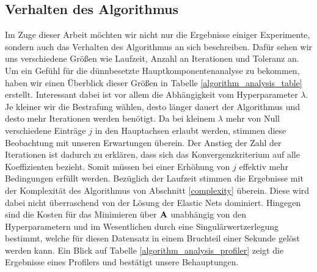 

\subsection{Verhalten des Algorithmus}

Im Zuge dieser Arbeit möchten wir nicht nur die Ergebnisse einiger Experimente, sondern auch das Verhalten des Algorithmus an sich beschreiben. Dafür sehen wir uns verschiedene Größen wie Laufzeit, Anzahl an Iterationen und Toleranz an. Um ein Gefühl für die dünnbesetzte Hauptkomponentenanalyse zu bekommen, haben wir einen Überblick dieser Größen in Tabelle \ref{algorithm_analysis_table} erstellt. Interessant dabei ist vor allem die Abhängigkeit vom Hyperparameter $\lambda$. Je kleiner wir die Bestrafung wählen, desto länger dauert der Algorithmus und desto mehr Iterationen werden benötigt. Da bei kleinem $\lambda$ mehr von Null verschiedene Einträge $j$ in den Hauptachsen erlaubt werden, stimmen diese Beobachtung mit unseren Erwartungen überein. Der Anstieg der Zahl der Iterationen ist dadurch zu erklären, dass sich das Konvergenzkriterium auf alle Koeffizienten bezieht. Somit müssen bei einer Erhöhung von $j$ effektiv mehr Bedingungen erfüllt werden. Bezüglich der Laufzeit stimmen die Ergebnisse mit der Komplexität des Algorithmus von Abschnitt \ref{complexity} überein. Diese wird dabei nicht überraschend von der Lösung der Elastic Nets dominiert. Hingegen sind die Kosten für das Minimieren über $\mathbf{A}$ unabhängig von den Hyperparametern und im Wesentlichen durch eine Singulärwertzerlegung bestimmt, welche für diesen Datensatz in einem Bruchteil einer Sekunde gelöst werden kann. Ein Blick auf Tabelle \ref{algorithm_analysis_profiler} zeigt die Ergebnisse eines Profilers und bestätigt unsere Behauptungen.


